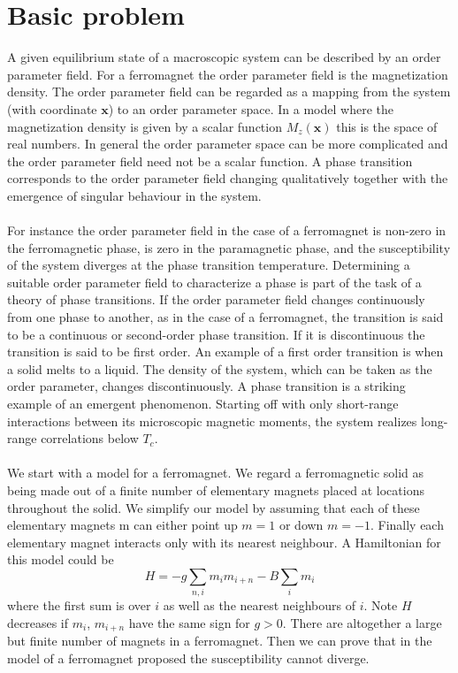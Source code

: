 \documentclass[cyan]{elegantnote}
\begin{document}
\section{Basic problem}
A given equilibrium state of a macroscopic system can be described by an order parameter field. For a ferromagnet the order parameter field is the magnetization density. 
The order parameter field can be regarded as a mapping from the system (with coordinate $\bm{x}$) to an order parameter space. In a model where the magnetization density is given by a scalar function $M_z(\bm{x})$ this is the space of real numbers. In general the order parameter space can be more complicated and the order parameter field need not be a scalar function.
A phase transition corresponds to the order parameter field
changing qualitatively together with the emergence of singular behaviour in the system.
\\ \\
For instance the order parameter field in the case of a ferromagnet is non-zero in the ferromagnetic phase, is zero in the paramagnetic phase, and the susceptibility of the system diverges at the phase transition temperature. 
Determining a suitable order parameter field to characterize a phase is part of the task of a theory of phase transitions. If the order parameter field changes continuously from one phase to another, as in the case of a ferromagnet, the transition is said to be a continuous or second-order phase transition. If it is discontinuous the transition is said to be first order. 
An example of a first order transition is when a solid melts
to a liquid. The density of the system, which can be taken as the order parameter, changes discontinuously. A phase transition is a striking example of an emergent phenomenon. Starting off with only short-range interactions between its microscopic magnetic moments, the system realizes long-range correlations below $T_c$.
\\ \\
We start with a model for a ferromagnet. We regard a ferromagnetic solid as being made out of a finite number of elementary magnets placed at locations throughout the solid.
We simplify our model by assuming that each of these elementary magnets m can either point up $m = 1$ or down $m = -1$. Finally each elementary magnet interacts only with its nearest neighbour. A Hamiltonian for this model could be
\[H = -g\sum_{n,i}m_im_{i+n} - B\sum_i m_i\]
where the first sum is over $i$ as well as the nearest neighbours of $i$. Note $H$ decreases if $m_i$, $m_{i+n}$ have the same sign for $g > 0$. There are altogether a large but finite number of magnets in a ferromagnet. Then we can prove that in the model of a ferromagnet proposed the susceptibility cannot diverge. 
\end{document}

